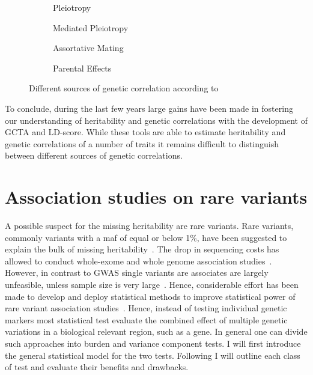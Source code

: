 \documentclass[../header.tex]{subfiles}
\begin{document}
\begin{figure}[htp]
  \begin{subfigure}[t]{0.5\textwidth}
    \centering
    \resizebox{0.5\linewidth}{!}{} 
    \caption{Pleiotropy}\label{fig:pleiotropy}
  \end{subfigure}
  \begin{subfigure}[t]{0.5\textwidth}
    \centering
    \resizebox{0.5\linewidth}{!}{} 
    \caption{Mediated Pleiotropy}\label{fig:mediated_pleiotropy}
  \end{subfigure}
  \begin{subfigure}[t]{0.5\textwidth}
    \centering
    \resizebox{0.6\linewidth}{!}{} 
    \caption{Assortative Mating}\label{fig:assortative_mating}
  \end{subfigure}
  \begin{subfigure}[t]{0.5\textwidth}
    \centering
    \resizebox{0.6\linewidth}{!}{}
    \caption{Parental Effects}\label{fig:parental_effects}
  \end{subfigure}
  \caption{Different sources of genetic correlation according to~\citet{Pickrell2016}}\label{fig:genetic_correlation}
\end{figure}

To conclude, during the last few years large gains have been made in fostering our understanding of heritability and genetic correlations with the development of GCTA and LD-score.
While these tools are able to estimate heritability and genetic correlations of a number of traits it remains difficult to distinguish between different sources of genetic correlations.

\section{Association studies on rare variants}
\label{sec:association_studies_on_rare_varitants}

A possible suspect for the missing heritability are rare variants.
Rare variants, commonly variants with a \acrfull{maf} of equal or below 1\%, have been suggested to explain the bulk of missing heritability~\cite{Jiang2013,Li2009a}.
The drop in sequencing costs has allowed to conduct whole-exome and whole genome association studies~\cite{Goodwin2016}.
However, in contrast to GWAS single variants are associates are largely unfeasible, unless sample size is very large~\cite{Lee2014}.
Hence, considerable effort has been made to develop and deploy statistical methods to improve statistical power of rare variant association studies~\cite{Morris2010,Zeng2014,Daye2012,Manuscript2013}.
Hence, instead of testing individual genetic markers most statistical test evaluate the combined effect of multiple genetic variations in a biological relevant region, such as a gene.
In general one can divide such approaches into burden and variance component tests.
I will first introduce the general statistical model for the two tests.
Following I will outline each class of test and evaluate their benefits and drawbacks.
\end{document}
